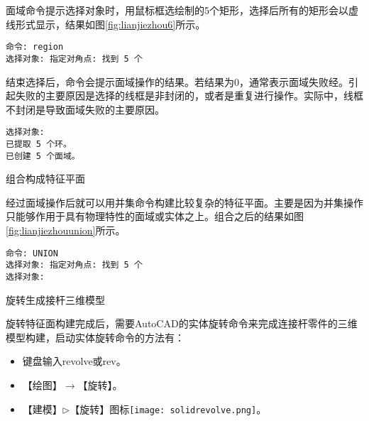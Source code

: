 \begin{procedure}
\begin{figure}[htbp]
\centering
\begin{floatrow}[2]
\end{floatrow}
\end{figure}
面域命令提示选择对象时，用鼠标框选绘制的5个矩形，选择后所有的矩形会以虚线形式显示，结果如图\ref{fig:lianjiezhou6}所示。
\begin{lstlisting}
命令: region
选择对象: 指定对角点: 找到 5 个
\end{lstlisting}
结束选择后，命令会提示面域操作的结果。若结果为0，通常表示面域失败经。引起失败的主要原因是选择的线框是非封闭的，或者是重复进行操作。实际中，线框不封闭是导致面域失败的主要原因。
\begin{lstlisting}
选择对象:
已提取 5 个环。
已创建 5 个面域。
\end{lstlisting}
\item 组合构成特征平面

经过面域操作后就可以用并集命令构建比较复杂的特征平面。主要是因为并集操作只能够作用于具有物理特性的面域或实体之上。组合之后的结果如图\ref{fig:lianjiezhouunion}所示。
\begin{lstlisting}
命令: UNION
选择对象: 指定对角点: 找到 5 个
选择对象:
\end{lstlisting}

\begin{figure}[htbp]
\centering
\begin{floatrow}[2]
\end{floatrow}
\end{figure}
\item 旋转生成接杆三维模型

旋转特征面构建完成后，需要AutoCAD的实体旋转命令来完成连接杆零件的三维模型构建，启动实体旋转命令的方法有：
\begin{itemize}
\item 键盘输入revolve或rev。
\item 【绘图】$\rightarrow$【旋转】。
\item 【建模】$\triangleright$【旋转】图标\texttt{[image: solidrevolve.png]}。
\end{itemize}


\end{procedure}
